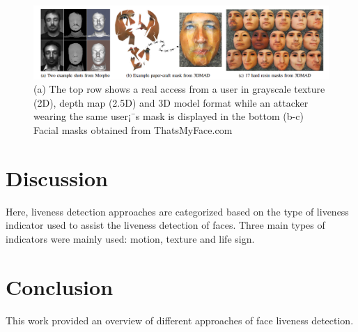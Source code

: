 \documentclass[journal]{IEEEtran}
\begin{document}
\begin{figure}[!t]
\centering
\includegraphics[width=1\linewidth]{img/3D_1}
\caption{(a) The top row shows a real access from a user in grayscale texture (2D), depth map (2.5D) and 3D model format while an attacker wearing the same user¡¯s mask is displayed in the bottom (b-c) Facial masks obtained from ThatsMyFace.com}
\label{fig_3D_1}
\end{figure}

\section{Discussion}

Here, liveness detection approaches are categorized based on the type of liveness indicator used to assist the liveness detection of faces. Three main types of indicators were mainly used: motion, texture and life sign.



\section{Conclusion}

This work provided an overview of different approaches of face liveness detection.






%
\end{document}
